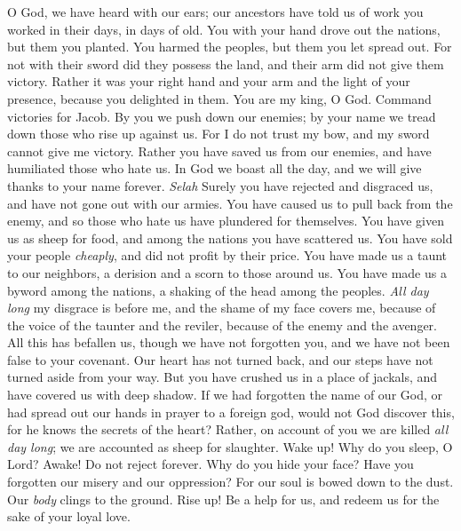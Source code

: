 \begin{biblechapter} %
 O God, we have heard with our ears; 
our ancestors have told us 
of work you worked in their days, 
in days of old.
\verse You with your hand drove out the nations, 
but them you planted. 
You harmed the peoples, 
but them you let spread out.
\verse For not with their sword 
did they possess the land, 
and their arm did not give them victory. 
Rather it was your right hand and your arm 
and the light of your presence, 
because you delighted in them.
\verse You are my king, O God. 
Command victories for Jacob.
\verse By you we push down our enemies; 
by your name we tread down those who rise up against us.
\verse For I do not trust my bow, 
and my sword cannot give me victory.
\verse Rather you have saved us from our enemies, 
and have humiliated those who hate us.
\verse In God we boast all the day, 
and we will give thanks to your name forever. \textit{Selah}
\verse Surely you have rejected and disgraced us, 
and have not gone out with our armies.
\verse You have caused us to pull back from the enemy, 
and so those who hate us have plundered for themselves.
\verse You have given us as sheep for food, 
and among the nations you have scattered us.
\verse You have sold your people \textit{cheaply}, 
and did not profit by their price.
\verse You have made us a taunt to our neighbors, 
a derision and a scorn to those around us.
\verse You have made us a byword among the nations, 
a shaking of the head among the peoples.
\verse \textit{All day long} my disgrace is before me, 
and the shame of my face covers me,
\verse because of the voice of the taunter and the reviler, 
because of the enemy and the avenger.
\verse All this has befallen us, though we have not forgotten you, 
and we have not been false to your covenant.
\verse Our heart has not turned back, 
and our steps have not turned aside from your way.
\verse But you have crushed us in a place of jackals, 
and have covered us with deep shadow.
\verse If we had forgotten the name of our God, 
or had spread out our hands in prayer to a foreign god,
\verse would not God discover this, 
for he knows the secrets of the heart?
\verse Rather, on account of you we are killed \textit{all day long}; 
we are accounted as sheep for slaughter.
\verse Wake up! Why do you sleep, O Lord? 
Awake! Do not reject forever.
\verse Why do you hide your face? 
Have you forgotten our misery and our oppression?
\verse For our soul is bowed down to the dust. 
Our \textit{body} clings to the ground.
\verse Rise up! Be a help for us, 
and redeem us for the sake of your loyal love.
\end{biblechapter}

